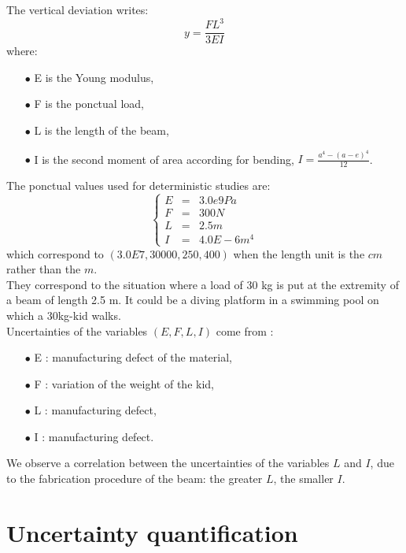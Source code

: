 \documentclass[11pt, french, A4wide]{article}
\theoremstyle{remark}
\theoremstyle{definition}
\begin{document}
The vertical deviation writes:
\begin{equation}\label{relBeam}
  y = \displaystyle \frac{FL^3}{3EI}
\end{equation}
 where:
\begin{itemize}
    \item[$\bullet$]  E is the Young modulus,
    \item[$\bullet$]  F is the ponctual load,
    \item[$\bullet$]  L is the length of the beam,
    \item[$\bullet$]  I is the second moment of area according for bending, $I = \displaystyle \frac{a^4 - (a-e)^4}{12}$.
\end{itemize}
\vspace*{0.2cm}

The ponctual values used for deterministic studies are:
$$
\left\{
\begin{array}{lcl}
 E & = & 3.0e9 Pa\\
 F & = & 300 N\\
 L & = & 2.5 m\\
 I & = & 4.0E-6 m^4
\end{array}
\right.
$$
which correspond to $(3.0E7, 30000, 250, 400)$ when the length unit is the $cm$ rather than the $m$.\\

They correspond to the situation where a load of 30 kg is put at the extremity of a beam of length 2.5 m. It could be a diving platform in a swimming pool on which a 30kg-kid walks. \\

Uncertainties of the variables $(E,F,L,I)$ come from :
  \begin{itemize}
    \item[$\bullet$]  E : manufacturing defect of the material,
    \item[$\bullet$]  F : variation of the weight of the kid,
    \item[$\bullet$]  L :  manufacturing defect,
    \item[$\bullet$]  I :  manufacturing defect.
  \end{itemize}
\vspace*{0.2cm}

We observe a correlation between the uncertainties of the variables $L$ and $I$, due to the fabrication procedure of the beam: the greater $L$, the smaller $I$.


\newpage
\section{Uncertainty quantification}
\end{document}
